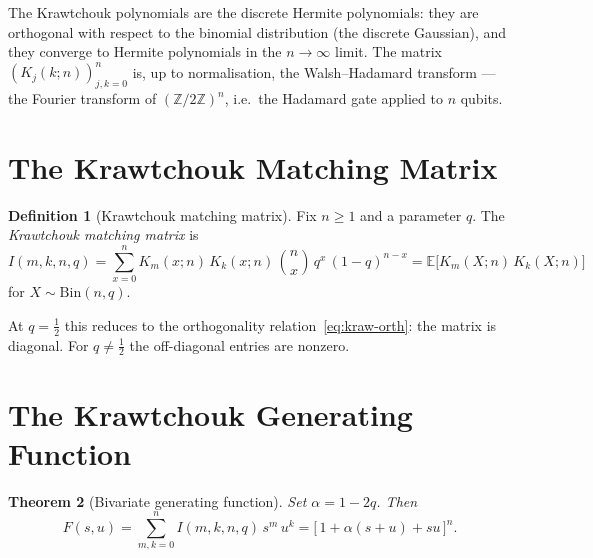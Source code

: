 \documentclass[11pt,a4paper]{article}
\theoremstyle{plain}
\newtheorem{theorem}{Theorem}[section]
\theoremstyle{definition}
\newtheorem{definition}[theorem]{Definition}
\begin{document}
\begin{tcolorbox}[colback=yellow!10, colframe=yellow!10, boxrule=0pt,
  sharp corners]
The Krawtchouk polynomials are the discrete Hermite polynomials: they
are orthogonal with respect to the binomial distribution (the discrete
Gaussian), and they converge to Hermite polynomials in the
$n \to \infty$ limit. The matrix $(K_j(k; n))_{j,k=0}^n$ is, up to
normalisation, the Walsh--Hadamard transform --- the Fourier transform
of $(\mathbb{Z}/2\mathbb{Z})^n$, i.e.\ the Hadamard gate applied to
$n$ qubits.
\end{tcolorbox}

\section{The Krawtchouk Matching Matrix}

\begin{tcolorbox}[colback=green!8, colframe=green!8, boxrule=0pt,
  sharp corners]
\begin{definition}[Krawtchouk matching matrix]\label{def:kraw}
Fix $n \ge 1$ and a parameter $q$. The \emph{Krawtchouk matching
matrix} is
\begin{equation}\label{eq:Imk}
  I(m, k, n, q)
  = \sum_{x=0}^{n} K_m(x; n)\, K_k(x; n)\, \binom{n}{x}\,
  q^x\, (1-q)^{n-x}
  = \mathbb{E}\bigl[K_m(X; n)\, K_k(X; n)\bigr]
\end{equation}
for $X \sim \mathrm{Bin}(n, q)$.
\end{definition}
\end{tcolorbox}

At $q = \tfrac12$ this reduces to the orthogonality
relation~\eqref{eq:kraw-orth}: the matrix is diagonal. For
$q \ne \tfrac12$ the off-diagonal entries are nonzero.

\section{The Krawtchouk Generating Function}

\begin{tcolorbox}[colback=black!5, colframe=black!5, boxrule=0pt,
  sharp corners]
\begin{theorem}[Bivariate generating function]\label{thm:kraw-gf}
Set $\alpha = 1 - 2q$. Then
\begin{equation}\label{eq:kraw-gf-main}
  F(s, u) = \sum_{m,k=0}^{n} I(m, k, n, q)\, s^m\, u^k
  = \bigl[\,1 + \alpha(s + u) + su\,\bigr]^n.
\end{equation}
\end{theorem}
\end{tcolorbox}
\end{document}
